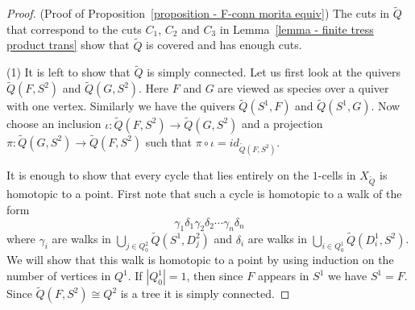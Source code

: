 \documentclass[a4paper, reqno]{amsart}
\theoremstyle{definition}
\begin{document}
\begin{proof}(Proof of Proposition~\ref{proposition - F-conn morita equiv})
	The cuts in $\tilde{Q}$ that correspond to the cuts $C_1$, $C_2$ and $C_3$ in Lemma~\ref{lemma - finite tress product trans} show that $\tilde{Q}$ is covered and has enough cuts.

	(1) It is left to show that $\tilde{Q}$ is simply connected. Let us first look at the quivers $\tilde{Q}(F, S^2)$ and $\tilde{Q}(G, S^2)$. Here $F$ and $G$ are viewed as species over a quiver with one vertex. Similarly we have the quivers $\tilde{Q}(S^1, F)$ and $\tilde{Q}(S^1, G)$. Now choose an inclusion $\iota: \tilde{Q}(F, S^2) \to \tilde{Q}(G, S^2)$ and a projection $\pi: \tilde{Q}(G, S^2) \to \tilde{Q}(F, S^2)$ such that $\pi\circ \iota = id_{\tilde{Q}(F, S^2)}$.

	It is enough to show that every cycle that lies entirely on the $1$-cells in $X_{\tilde{Q}}$ is homotopic to a point. First note that such a cycle is homotopic to a walk of the form
	\begin{equation*}
		\gamma_1\delta_1\gamma_2\delta_2\cdots \gamma_n\delta_n
	\end{equation*}
	where $\gamma_i$ are walks in $\bigcup_{j\in Q^2_0} \tilde{Q}(S^1, D^2_j)$ and $\delta_i$ are walks in $\bigcup_{i\in Q^1_0}\tilde{Q}(D^1_i, S^2)$. We will show that this walk is homotopic to a point by using induction on the number of vertices in $Q^1$. If $|Q^1_0| = 1$, then since $F$ appears in $S^1$ we have $S^1 = F$. Since $\tilde{Q}(F, S^2) \cong Q^2$ is a tree it is simply connected.


\end{proof}
\end{document}
